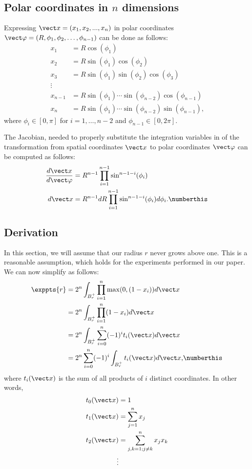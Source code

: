\subsection{Polar coordinates in $n$ dimensions}


Expressing $\vx = (x_1, x_2, ..., x_n)$ in polar coordinates $\vvarphi = (R, \phi_1, \phi_2, \dotsc, \phi_{n-1})$ can be done as follows:
\begin{align*}
x_1 &= R \cos(\phi_1)\\
x_2 &= R \sin(\phi_1) \cos(\phi_2)\\
x_3 &= R \sin(\phi_1) \sin(\phi_2) \cos(\phi_3)\\
\vdots\\
x_{n-1} &= R \sin(\phi_1) \cdots \sin(\phi_{n-2}) \cos(\phi_{n-1})\\
x_n &= R \sin(\phi_1) \cdots \sin(\phi_{n-2}) \sin(\phi_{n-1}) \text{,}
\end{align*}
where $\phi_i \in [0, \pi]$ for $i = 1, \dotsc, n-2$ and $\phi_{n-1} \in [0, 2\pi]$.

The Jacobian, needed to properly substitute the integration variables in  of the transformation from spatial coordinates $\vx$ to polar coordinates $\vvarphi$ can be computed as follows:
\begin{align*}
  \frac{d\vx}{d\vvarphi} &= R^{n-1} \prod_{i=1}^{n-1}\sin^{n-1-i}(\phi_i) \\
  d\vx &= R^{n-1} dR \prod_{i=1}^{n-1}\sin^{n-1-i}(\phi_i) d\phi_i
  \text{.}
\numberthis \label{eq:spherical}
\end{align*}


\subsection{Derivation}

In this section, we will assume that our radius $r$ never grows above one. This is a reasonable assumption, which holds for the experiments performed in our paper. We can now simplify  as follows:
\begin{align*}
\exppts{r} &= 2^n \int_{B^{+}_r} \prod_{i=1}^{n} \max(0,(1-x_i)) d\vx \\
  &= 2^n\int_{B^{+}_r} \prod_{i=1}^{n} (1-x_i) d\vx \\
  &= 2^n \int_{B^{+}_r} \sum_{i=0}^{n} (-1)^{i} t_i(\vx) d\vx \\
  &= 2^n \sum_{i=0}^{n} (-1)^{i} \int_{B^{+}_r}  t_i(\vx) d\vx
     \text{,}
\numberthis \label{eq:ti}
\end{align*}
where $t_i(\vx)$ is the sum of all products of $i$ distinct coordinates. 
In other words,
\begin{align*}
t_0(\vx) &= 1 \\
t_1(\vx) &= \sum_{j=1}^n x_j \\
t_2(\vx) &= \sum_{j,k=1; j\ne k}^n x_j x_k \\
\vdots
\end{align*}

